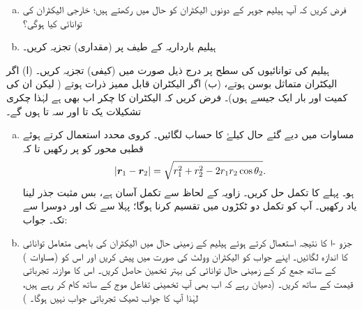 \begin{enumerate}[a.]
\item
فرض کریں کہ آپ ہیلیم  جوہر کے دونوں الیکٹران کو  حال میں رکھتے ہیں؛ خارجی  الیکٹران کی توانائی کیا ہوگی؟
\item
ہیلیم بارداریہ  کے طیف پر  (مقداری)  تجزیہ کریں۔ 
\end{enumerate}
ہیلیم کی توانائیوں کی سطح پر درج ذیل صورت میں (کیفی) تجزیہ کریں۔ (ا) اگر الیکٹران متماثل بوسن ہوتے،  (ب) اگر الیکٹران قابل ممیز ذرات  ہوتے ( لیکن   ان کی کمیت اور بار  ایک جیسے ہوں)۔ فرض کریں کہ الیکٹران کا چکر اب بھی   ہے  لہٰذا   چکری  تشکیلات یک تا اور سہ تا ہوں  گے۔
\begin{enumerate}[a.]
\item
مساوات     میں دیے گئے  حال   کیلۓ   کا حساب لگائیں۔   کروی محدد استعمال کرتے ہوئے قطبی محور کو  پر رکھیں  تا کہ
\begin{align*}
|{{\boldsymbol{r}}}_{1}-{{\boldsymbol{r}}}_{2}|= \sqrt{r_1^2+ r_2^2 -2r_{1} r_{2}\cos\theta_{2}}.
\end{align*}
ہو۔ پہلے     کا تکمل حل کریں۔ زاویہ        کے لحاظ سے تکمل آسان ہے، بس مثبت جذر لینا  یاد رکھیں۔ آپ کو           تکمل دو ٹکڑوں میں تقسیم کرنا ہوگا؛ پہلا سے            تک اور دوسرا        سے  تک۔ جواب:  
\item
جزو -ا  کا نتیجہ استعمال کرتے ہوئے ہیلیم کے زمینی حال میں الیکٹران کی باہمی متعامل توانائی کا اندازہ لگائیں۔ اپنے جواب کو الیکٹران وولٹ کی صورت میں پیش کریں اور اس کو  (مساوات  )  کے ساتھ جمع کر کے زمینی حال توانائی کی بہتر تخمین  حاصل کریں۔ اس کا موازنہ تجرباتی قیمت کے ساتھ کریں۔ (دھیان رہے کہ اب بھی آپ تخمینی تفاعل موج کے ساتھ کام کر رہے ہیں،  لہٰذا آپ کا جواب ٹھیک تجرباتی جواب نہیں ہوگا۔  )
\end{enumerate}

